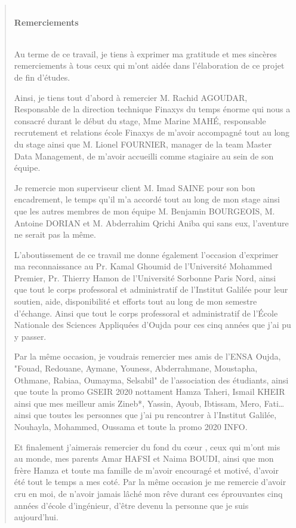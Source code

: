 \newpage
\newenvironment{remerciment}
     {\vspace{6ex}\begin{quotation}\begin{center}\begin{em}}
     {\par\end{em}\end{center}\end{quotation}}

     \begin{remerciment}
          {\huge \hfill \\ \textbf {Remerciements} \\~\\} 
\par Au terme de ce travail, je tiens à exprimer ma gratitude et mes sincères remerciements à tous ceux qui m’ont aidée dans l’élaboration de ce projet de fin d’études.
\par Ainsi, je tiens tout d’abord à remercier M. Rachid AGOUDAR, Responsable de la direction technique Finaxys du temps énorme qui nous a consacré durant le début du stage, Mme Marine MAHÉ, responsable recrutement et relations école Finaxys de m'avoir accompagné tout au long du stage ainsi que M. Lionel FOURNIER, manager de la team Master Data Management, de m’avoir accueilli comme stagiaire au sein de son équipe.
\par Je remercie mon superviseur client M. Imad SAINE pour son bon encadrement, le temps qu’il m’a accordé tout au long de mon stage ainsi que les autres membres de mon équipe M. Benjamin BOURGEOIS, M. Antoine DORIAN et M. Abderrahim Qrichi Aniba qui sans eux, l'aventure ne serait pas la même.
\par L’aboutissement de ce travail me donne également l’occasion d’exprimer ma reconnaissance au Pr. Kamal Ghoumid de l'Université Mohammed Premier, Pr. Thierry Hamon de l’Université Sorbonne Paris Nord, ainsi que tout le corps professoral et administratif de l’Institut Galilée pour leur soutien, aide, disponibilité et efforts tout au long de mon semestre d'échange. Ainsi que tout le corps professoral et administratif de l'École Nationale des Sciences Appliquées d'Oujda pour ces cinq années que j'ai pu y passer.
\par Par la même occasion, je voudrais remercier mes amis de l'ENSA Oujda, "Fouad, Redouane, Aymane, Youness, Abderrahmane, Moustapha, Othmane, Rabiaa, Oumayma, Selsabil" de l'association des étudiants, ainsi que toute la promo GSEIR 2020 nottament Hamza Taheri, Ismail KHEIR ainsi que mes meilleur amis Zineb*, Yassin, Ayoub, Ibtissam, Mero, Fati\dots ainsi que toutes les personnes que j'ai pu rencontrer à l'Institut Galilée, Nouhayla, Mohammed, Oussama et toute la promo 2020 INFO.
\par Et finalement j'aimerais remercier du fond du cœur , ceux qui m'ont mis au monde, mes parents Amar HAFSI et Naima BOUDI, ainsi que mon frère Hamza et toute ma famille de m'avoir encouragé et motivé, d'avoir été tout le temps a mes coté. Par la même occasion je me remercie d'avoir cru en moi, de n'avoir jamais lâché mon rêve durant ces éprouvantes cinq années d'école d'ingénieur, d'être devenu la personne que je suis aujourd'hui.

\end{remerciment}